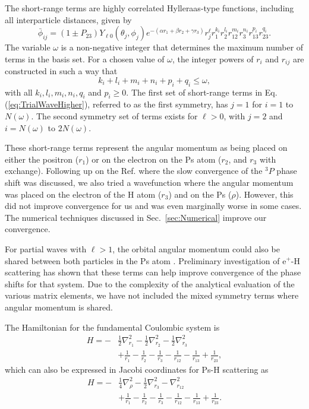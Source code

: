 \documentclass[preprint,showpacs,showkeys,preprintnumbers,amsmath,amssymb,longbibliography,pra,aps]{revtex4-1}
\begin{document}
The short-range terms are highly correlated Hylleraas-type functions, including
all interparticle distances, given by
\begin{equation}
\label{eq:PhiDef}
\bar{\phi}_{ij} = \left(1 \pm P_{23}\right) Y_{\ell 0}(\theta_j,\phi_j)
e^{-(\alpha r_1 + \beta r_2 + \gamma r_3)}
r_j^{\ell} r_1^{k_i} r_2^{l_i} r_{12}^{m_i} r_3^{n_i} r_{13}^{p_i} r_{23}^{q_i}.
\end{equation}
The variable $\omega$ is a non-negative integer that determines the maximum
number of terms in the basis set. For a chosen value of $\omega$, the integer
powers of $r_i$ and $r_{ij}$ are constructed in such a way that 
\begin{equation}
k_i + l_i + m_i + n_i + p_i + q_i \leq \omega,
\end{equation}
with all $k_i, l_i, m_i, n_i, q_i$ and $p_i \geq 0$.
The first set of short-range terms in Eq. (\ref{eq:TrialWaveHigher}), referred
to as the first symmetry, has $j=1$ for $i=1$ to $N(\omega)$. The second
symmetry set of terms exists for $\ell > 0$, with $j=2$ and $i = N(\omega)$ to
$2N(\omega)$.

These short-range terms represent the angular momentum as being placed on 
either the positron ($r_1$) or on the electron on the Ps atom ($r_2$, and $r_3$
with exchange). Following up on the Ref. \cite{VanReeth2004} where the slow 
convergence of the $^3P$ phase shift was discussed, we also tried a 
wavefunction where the angular momentum was placed on the electron of the H 
atom ($r_3$) and on the Ps ($\rho$). However, this did not improve 
convergence for us and was even marginally worse in some cases. The numerical 
techniques discussed in Sec.~\ref{sec:Numerical} improve our convergence.

For partial waves with $\ell>1$, the orbital angular momentum could also be 
shared between both particles in the Ps atom \cite{Schwartz1961a}. 
Preliminary investigation of e$^+$-H scattering \cite{VanReeth2015} has shown 
that these terms can help improve convergence of the phase shifts for that 
system. Due to the complexity of the analytical evaluation of the various 
matrix elements, we have not included the mixed symmetry terms where angular 
momentum is shared.


The Hamiltonian for the fundamental Coulombic system is
\begin{align}
H = -&\frac{1}{2} \nabla_{r_1}^2 - \frac{1}{2} \nabla_{r_2}^2 - \frac{1}{2}
  \nabla_{r_3}^2  \nonumber \\
&+ \frac{1}{r_1} - \frac{1}{r_2} - \frac{1}{r_3} - \frac{1}{r_{12}} -
  \frac{1}{r_{13}}+\frac {1}{r_{23}},
\label{eq:Hamiltonian1}
\end{align}
which can also be expressed in Jacobi coordinates for Ps-H scattering as
\begin{align}
H = -&\frac{1}{4} \nabla_{\rho}^2 - \frac{1}{2} \nabla_{r_3}^2 -
  \nabla_{r_{12}}^2  \nonumber \\
&+ \frac{1}{r_1} - \frac{1}{r_2} - \frac{1}{r_3} - \frac{1}{r_{12}} -
  \frac{1}{r_{13}}+\frac{1}{r_{23}}.
\label{eq:Hamiltonian2}
\end{align}
\end{document}
